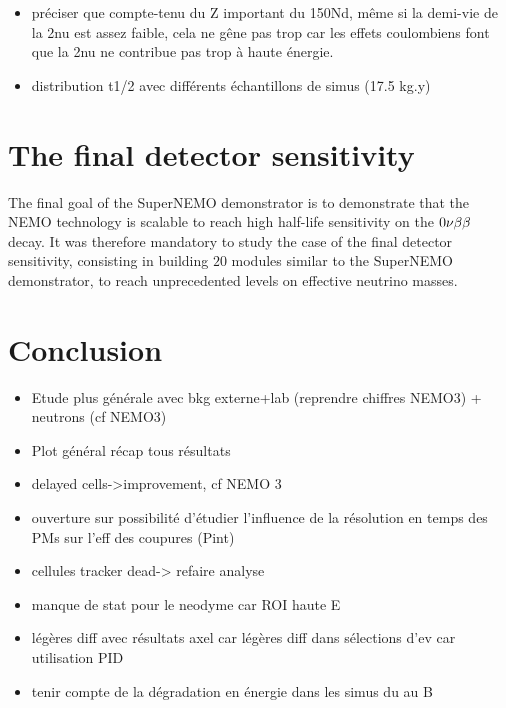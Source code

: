 \begin{itemize}
\item préciser que compte-tenu du Z important du 150Nd, même si la demi-vie de la 2nu est assez faible, cela ne gêne pas trop car les effets coulombiens font que la 2nu ne contribue pas trop à haute énergie.
\item distribution t1/2 avec différents échantillons de simus (17.5 kg.y)
\end{itemize}

\section{The final detector sensitivity}

The final goal of the SuperNEMO demonstrator is to demonstrate that the NEMO technology is scalable to reach high half-life sensitivity on the $0\nu\beta\beta$ decay.
It was therefore mandatory to study the case of the final detector sensitivity, consisting in building $20$ modules similar to the SuperNEMO demonstrator, to reach unprecedented levels on effective neutrino masses.



\section{Conclusion}
\begin{itemize}
\item Etude plus générale avec bkg externe+lab (reprendre chiffres NEMO3) + neutrons (cf NEMO3)
\item Plot général récap tous résultats
\item delayed cells->improvement, cf NEMO 3
\item ouverture sur possibilité d'étudier l'influence de la résolution en temps des PMs sur l'eff des coupures (Pint)
\item cellules tracker dead-> refaire analyse
\item manque de stat pour le neodyme car ROI haute E
\item légères diff avec résultats axel car légères diff dans sélections d'ev car utilisation PID
  \item tenir compte de la dégradation en énergie dans les simus du au B
\end{itemize}
